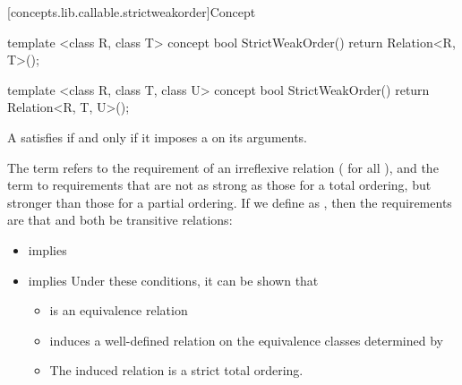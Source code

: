 [concepts.lib.callable.strictweakorder]{Concept }

%
\begin{itemdecl}
template <class R, class T>
concept bool StrictWeakOrder() {
  return Relation<R, T>();
}

template <class R, class T, class U>
concept bool StrictWeakOrder() {
  return Relation<R, T, U>();
}
\end{itemdecl}

\begin{itemdescr}
\pnum
A  satisfies  if and only if
it imposes a  on its arguments.

\pnum
The term
refers to the
requirement of an irreflexive relation ( for all ),
and the term
to requirements that are not as strong as
those for a total ordering,
but stronger than those for a partial
ordering.
If we define
as
,
then the requirements are that
and
both be transitive  relations:

\begin{itemize}
\item
{}
implies
\item
{}
implies
\enternote
Under these conditions, it can be shown that
\begin{itemize}
\item
{}
is an equivalence relation
\item
{}
induces a well-defined relation on the equivalence
classes determined by
\item
The induced relation is a strict total ordering.
\exitnote
\end{itemize}
\end{itemize}
\end{itemdescr}

